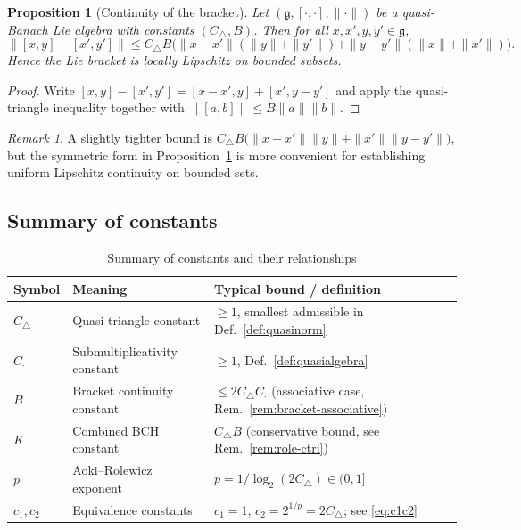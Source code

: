 \documentclass[10pt]{amsart}
\newtheorem{proposition}[theorem]{Proposition}
\theoremstyle{definition}
\theoremstyle{remark}
\newtheorem{remark}[theorem]{Remark}
\numberwithin{equation}{section}
\newcommand{\Ctri}{C_{\triangle}}    %
\newcommand{\Cmult}{C_{\cdot}}       %
\newcommand{\Cbracket}{B}            %
\newcommand{\Ctotal}{K}              %
\begin{document}
\begin{proposition}[Continuity of the bracket]\label{prop:bracketcont}
Let $(\mathfrak{g},[\cdot,\cdot],\|\cdot\|)$ be a quasi-Banach Lie algebra with constants
$(\Ctri,\Cbracket)$.  Then for all $x,x',y,y'\in\mathfrak{g}$,
\[
  \|[x,y]-[x',y']\| \le
  \Ctri\Cbracket\bigl(\|x-x'\|(\|y\|+\|y'\|) + \|y-y'\|(\|x\|+\|x'\|)\bigr).
\]
Hence the Lie bracket is locally Lipschitz on bounded subsets.
\end{proposition}

\begin{proof}
Write $[x,y]-[x',y'] = [x-x',y] + [x',y-y']$ and apply the quasi-triangle inequality
together with $\|[a,b]\|\le \Cbracket\|a\|\|b\|$.
\end{proof}

\begin{remark}
A slightly tighter bound is
$\Ctri\Cbracket\bigl(\|x-x'\|\|y\| + \|x'\|\|y-y'\|\bigr)$, but the symmetric form in
Proposition~\ref{prop:bracketcont} is more convenient for establishing uniform Lipschitz
continuity on bounded sets.
\end{remark}

\subsection{Summary of constants}

\begin{table}[h!]
\centering
\caption{Summary of constants and their relationships}
\label{tab:constants}
\begin{tabular}{llp{6.5cm}}
\toprule
Symbol & Meaning & Typical bound / definition \\
\midrule
$\Ctri$ & Quasi-triangle constant
         & $\geq 1$, smallest admissible in Def.~\ref{def:quasinorm} \\
$\Cmult$ & Submultiplicativity constant
          & $\geq 1$, Def.~\ref{def:quasialgebra} \\
$\Cbracket$ & Bracket continuity constant
             & $\leq 2\Ctri\Cmult$ (associative case,
               Rem.~\ref{rem:bracket-associative}) \\
$\Ctotal$ & Combined BCH constant
           & $\Ctri\Cbracket$ (conservative bound, see Rem.~\ref{rem:role-ctri}) \\
$p$ & Aoki--Rolewicz exponent
    & $p = 1/\log_2(2\Ctri) \in (0,1]$ \\
$c_1, c_2$ & Equivalence constants
            & $c_1 = 1$, $c_2 = 2^{1/p} = 2\Ctri$; see \eqref{eq:c1c2} \\
\bottomrule
\end{tabular}
\end{table}
\end{document}
